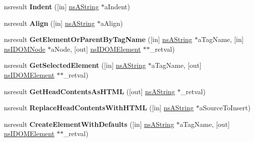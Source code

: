\begin{DoxyCompactItemize}
nsresult {\bfseries Indent} (\mbox{[}in\mbox{]} \hyperlink{structns_string_container}{ns\+A\+String} $\ast$a\+Indent)
\item 
\mbox{\label{interfacens_i_h_t_m_l_editor_aecd401db9eee9d508764a2cdd0497e60}} 
nsresult {\bfseries Align} (\mbox{[}in\mbox{]} \hyperlink{structns_string_container}{ns\+A\+String} $\ast$a\+Align)
\item 
\mbox{\label{interfacens_i_h_t_m_l_editor_adbde6bb72a7254cf9015465d7a93df27}} 
nsresult {\bfseries Get\+Element\+Or\+Parent\+By\+Tag\+Name} (\mbox{[}in\mbox{]} \hyperlink{structns_string_container}{ns\+A\+String} $\ast$a\+Tag\+Name, \mbox{[}in\mbox{]} \hyperlink{interfacens_i_d_o_m_node}{ns\+I\+D\+O\+M\+Node} $\ast$a\+Node, \mbox{[}out\mbox{]} \hyperlink{interfacens_i_d_o_m_element}{ns\+I\+D\+O\+M\+Element} $\ast$$\ast$\+\_\+retval)
\item 
\mbox{\label{interfacens_i_h_t_m_l_editor_aee77d4423078f318530e4b373f5d09c3}} 
nsresult {\bfseries Get\+Selected\+Element} (\mbox{[}in\mbox{]} \hyperlink{structns_string_container}{ns\+A\+String} $\ast$a\+Tag\+Name, \mbox{[}out\mbox{]} \hyperlink{interfacens_i_d_o_m_element}{ns\+I\+D\+O\+M\+Element} $\ast$$\ast$\+\_\+retval)
\item 
\mbox{\label{interfacens_i_h_t_m_l_editor_ae521bd67bf4df9c6c5a329057e99040b}} 
nsresult {\bfseries Get\+Head\+Contents\+As\+H\+T\+ML} (\mbox{[}out\mbox{]} \hyperlink{structns_string_container}{ns\+A\+String} $\ast$\+\_\+retval)
\item 
\mbox{\label{interfacens_i_h_t_m_l_editor_a528346e72d1caec37e8b214757e80b93}} 
nsresult {\bfseries Replace\+Head\+Contents\+With\+H\+T\+ML} (\mbox{[}in\mbox{]} \hyperlink{structns_string_container}{ns\+A\+String} $\ast$a\+Source\+To\+Insert)
\item 
\mbox{\label{interfacens_i_h_t_m_l_editor_aa3b92025ed66ed229d7ed4963986fe25}} 
nsresult {\bfseries Create\+Element\+With\+Defaults} (\mbox{[}in\mbox{]} \hyperlink{structns_string_container}{ns\+A\+String} $\ast$a\+Tag\+Name, \mbox{[}out\mbox{]} \hyperlink{interfacens_i_d_o_m_element}{ns\+I\+D\+O\+M\+Element} $\ast$$\ast$\+\_\+retval)
$$
\end{DoxyCompactItemize}
